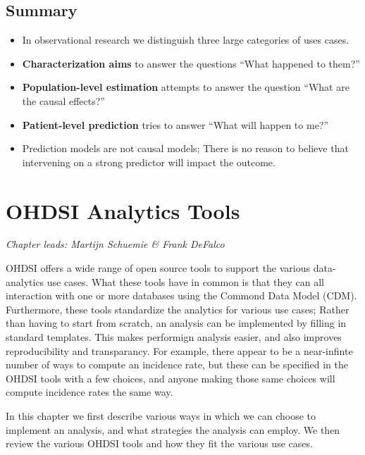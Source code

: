\documentclass[11pt]{book}
\theoremstyle{definition}
\theoremstyle{definition}
\theoremstyle{definition}
\theoremstyle{remark}
\let\BeginKnitrBlock\begin \let\EndKnitrBlock\end
\begin{document}
\hypertarget{summary-3}{%
\section{Summary}\label{summary-3}}

\BeginKnitrBlock{rmdsummary}
\begin{itemize}
\item
  In observational research we distinguish three large categories of uses cases.
\item
  \textbf{Characterization aims} to answer the questions ``What happened to them?''
\item
  \textbf{Population-level estimation} attempts to answer the question ``What are the causal effects?''
\item
  \textbf{Patient-level prediction} tries to answer ``What will happen to me?''
\item
  Prediction models are not causal models; There is no reason to believe that intervening on a strong predictor will impact the outcome.
\end{itemize}
\EndKnitrBlock{rmdsummary}

\hypertarget{OhdsiAnalyticsTools}{%
\chapter{OHDSI Analytics Tools}\label{OhdsiAnalyticsTools}}

\emph{Chapter leads: Martijn Schuemie \& Frank DeFalco}

OHDSI offers a wide range of open source tools to support the various data-analytics use cases. What these tools have in common is that they can all interaction with one or more databases using the Commond Data Model (CDM). Furthermore, these tools standardize the analytics for various use cases; Rather than having to start from scratch, an analysis can be implemented by filling in standard templates. This makes performign analysis easier, and also improves reproducibility and transparancy. For example, there appear to be a near-infinte number of ways to compute an incidence rate, but these can be specified in the OHDSI tools with a few choices, and anyone making those same choices will compute incidence rates the same way.

In this chapter we first describe various ways in which we can choose to implement an analysis, and what strategies the analysis can employ. We then review the various OHDSI tools and how they fit the various use cases.
\end{document}
